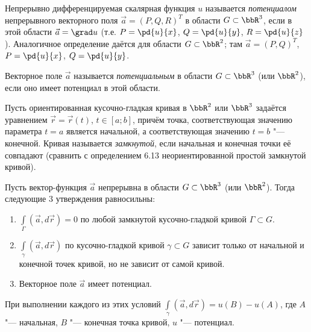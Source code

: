 \begin{defn}
Непрерывно дифференцируемая скалярная функция $u$ называется \textit{потенциалом} непрерывного векторного поля $\vec{a} = (P, Q, R)^T$ в области $G \subset \bbR^3$, если в этой области $\vec{a} = \grad u$ (т.е. $P = \pd{u}{x}$, $Q = \pd{u}{y}$, $R = \pd{u}{z}$). Аналогичное определение даётся для области $G \subset \bbR^2$; там $\vec{a} = (P, Q)^T$, $P = \pd{u}{x}$, $Q = \pd{u}{y}$.
\end{defn}

\begin{defn}
Векторное поле $\vec{a}$ называется \textit{потенциальным} в области $G \subset \bbR^3$ (или $\bbR^2$), если оно имеет потенциал в этой области.
\end{defn}

\begin{defn}
Пусть ориентированная кусочно-гладкая кривая в $\bbR^2$ или $\bbR^3$ задаётся уравнением $\vec{r} = \vec{r}(t)$, $t \in [a;b]$, причём точка, соответствующая значению параметра $t = a$ является начальной, а соответствующая значению $t = b$ "--- конечной. Кривая называется \textit{замкнутой}, если начальная и конечная точки её совпадают (сравнить с определением 6.13 неориентированной простой замкнутой кривой).
\end{defn}

\begin{thm}
Пусть вектор-функция $\vec{a}$ непрерывна в области $G \subset \bbR^3$ (или $\bbR^2$). Тогда следующие $3$ утверждения равносильны:
\begin{enumerate}
\item[$1^\circ$.] $\int\limits_\Gamma (\vec{a}, d\vec{r}) = 0$ по любой замкнутой кусочно-гладкой кривой $\Gamma \subset G$.
\item[$2^\circ$.] $\int\limits_\gamma (\vec{a}, d\vec{r})$ по кусочно-гладкой кривой $\gamma \subset G$ зависит только от начальной и конечной точек кривой, но не зависит от самой кривой.
\item[$3^\circ$.] Векторное поле $\vec{a}$ имеет потенциал.
\end{enumerate}
При выполнении каждого из этих условий $\int\limits_\gamma (\vec{a}, d\vec{r}) = u(B) - u(A)$, где $A$ "--- начальная, $B$ "--- конечная точка кривой, $u$ "--- потенциал.
\end{thm}

